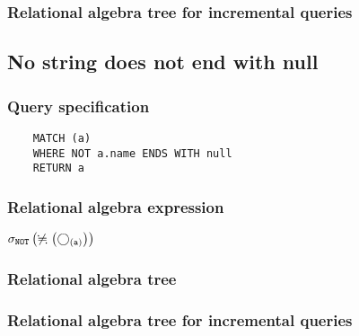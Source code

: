 	\subsubsection*{Relational algebra tree for incremental queries}

	\subsection{No string does not end with null}

	\subsubsection*{Query specification}

	\begin{lstlisting}
	MATCH (a)
	WHERE NOT a.name ENDS WITH null
	RETURN a
	\end{lstlisting}


	\subsubsection*{Relational algebra expression}

	$\selection{\mathtt{NOT}} \left(\alldifferent{} \left(\getvertices{a}{}\right)\right)$

	\subsubsection*{Relational algebra tree}


	\subsubsection*{Relational algebra tree for incremental queries}

